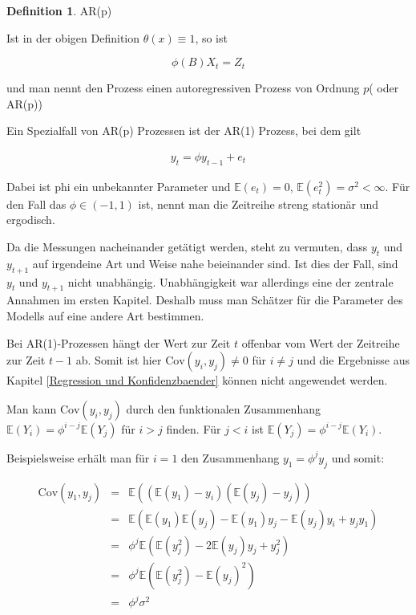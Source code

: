 \documentclass[12pt,a4paper]{article}
\theoremstyle{definition}
\newtheorem{Definition}{Definition}[subsection]
\theoremstyle{definition}
\theoremstyle{definition}
\theoremstyle{definition}
\begin{document}
\begin{Definition}
AR(p)

Ist in der obigen Definition $\theta(x) \equiv 1$, so ist 

\begin{equation*}
\phi(B) X_t = Z_t
\end{equation*}

und man nennt den Prozess einen autoregressiven Prozess von Ordnung $p$( oder AR(p))
\end{Definition}

Ein Spezialfall von AR(p) Prozessen ist der AR(1) Prozess, bei dem gilt

\begin{align}
y_t = \phi y_{t-1} + e_t
\end{align}

Dabei ist \gls{phi} ein unbekannter Parameter und $\mathbb{E}(e_t)=0$, $\mathbb{E}(e_t^2)=\sigma^2 < \infty$. Für den Fall das $\phi \in (-1,1)$ ist, nennt man die Zeitreihe streng stationär und ergodisch. 

Da die Messungen nacheinander getätigt werden, steht zu vermuten, dass $y_t$ und $y_{t+1}$ auf irgendeine Art und Weise nahe beieinander sind. Ist dies der Fall, sind $y_t$ und $y_{t+1}$ nicht unabhängig. Unabhängigkeit war allerdings eine der zentrale Annahmen im ersten Kapitel. Deshalb muss man Schätzer für die Parameter des Modells auf eine andere Art bestimmen.

Bei AR(1)-Prozessen hängt der Wert zur Zeit $t$ offenbar vom Wert der Zeitreihe zur Zeit $t-1$ ab. Somit ist hier $\text{Cov}(y_i,y_j) \neq 0$ für $i \neq j$ und die Ergebnisse aus Kapitel \ref{Regression und Konfidenzbaender} können nicht angewendet werden. 

Man kann $\text{Cov}(y_i,y_j)$ durch den funktionalen Zusammenhang $\mathbb{E}(Y_i) = \phi^{i-j} \mathbb{E}(Y_{j})$ für $i>j$ finden. Für $j<i$ ist $\mathbb{E}(Y_j) = \phi^{i-j} \mathbb{E}(Y_i)$. 

Beispielsweise erhält man für $i=1$ den Zusammenhang $y_1 = \phi^j y_j$ und somit:

\begin{eqnarray*}
\text{Cov}(y_1, y_j) &=& \mathbb{E}((\mathbb{E}(y_1)-y_i)(\mathbb{E}(y_j)-y_j)) \\
&=& \mathbb{E}(\mathbb{E}(y_1)\mathbb{E}(y_j) - \mathbb{E}(y_1)y_j - \mathbb{E}(y_j)y_i +y_j y_1) \\
&=& \phi^j \mathbb{E}(\mathbb{E}(y_j^2) - 2 \mathbb{E}(y_j)y_j + y_j^2) \\
&=& \phi^j \mathbb{E}(\mathbb{E}(y_j^2)-\mathbb{E}(y_j)^2) \\
&=& \phi^j \sigma^2
\end{eqnarray*}
\end{document}
